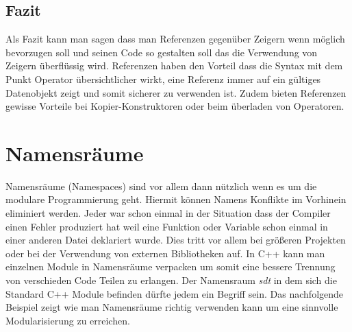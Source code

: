\documentclass[MES,Master,ngerman]{twbook}%
\begin{document}
\subsection{Fazit}
Als Fazit kann man sagen dass man Referenzen gegenüber Zeigern wenn möglich bevorzugen soll und seinen Code so gestalten soll das die Verwendung von Zeigern überflüssig wird. Referenzen haben den Vorteil dass die Syntax mit dem Punkt Operator übersichtlicher wirkt, eine Referenz immer auf ein gültiges Datenobjekt zeigt und somit sicherer zu verwenden ist. Zudem bieten Referenzen gewisse Vorteile bei Kopier-Konstruktoren oder beim überladen von Operatoren.
\newpage
\section{Namensräume}
Namensräume (Namespaces) sind vor allem dann nützlich wenn es um die modulare Programmierung geht. Hiermit können Namens Konflikte im Vorhinein eliminiert werden. Jeder war schon einmal in der Situation dass der Compiler einen Fehler produziert hat weil eine Funktion oder Variable schon einmal in einer anderen Datei deklariert wurde. Dies tritt vor allem bei größeren Projekten oder bei der Verwendung von externen Bibliotheken auf. In C++ kann man einzelnen Module in Namensräume verpacken um somit eine bessere Trennung von verschieden Code Teilen zu erlangen. Der Namensraum \textit{sdt} in dem sich die Standard C++ Module befinden dürfte jedem ein Begriff sein. Das nachfolgende Beispiel zeigt wie man Namensräume richtig verwenden kann um eine sinnvolle Modularisierung zu erreichen. \newline
\end{document}
